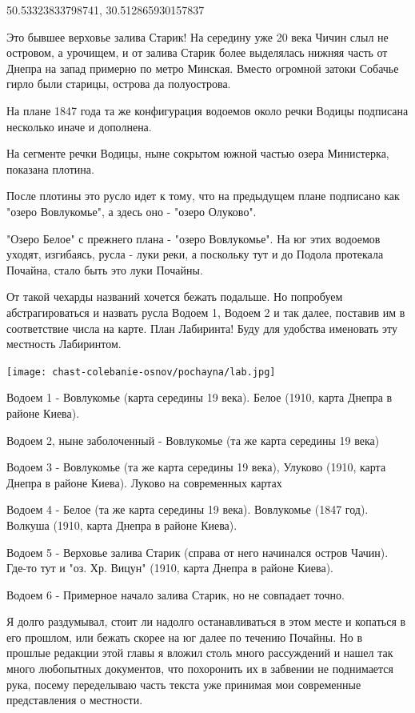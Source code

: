 50.53323833798741, 30.512865930157837 

Это бывшее верховье залива Старик!
На середину уже 20 века Чичин слыл не островом, а урочищем, и от залива Старик более выделялась нижняя часть от Днепра на запад примерно по метро Минская. Вместо огромной затоки Собачье гирло были старицы, острова да полуострова.

На плане 1847 года та же конфигурация водоемов около речки Водицы подписана несколько иначе и дополнена.

На сегменте речки Водицы, ныне сокрытом южной частью озера Министерка, показана плотина.

После плотины это русло идет к тому, что на предыдущем плане подписано как "озеро Вовлукомье", а здесь оно - "озеро Олуково".

"Озеро Белое" с прежнего плана - "озеро Вовлукомье". На юг этих водоемов уходят, изгибаясь, русла - луки реки, а поскольку тут и до Подола протекала Почайна, стало быть это луки Почайны.

От такой чехарды названий хочется бежать подальше. Но попробуем абстрагироваться и назвать русла Водоем 1, Водоем 2 и так далее, поставив им в соответствие числа на карте. План  Лабиринта! Буду для удобства именовать эту местность Лабиринтом.

\begin{center}
\texttt{[image: chast-colebanie-osnov/pochayna/lab.jpg]}
\end{center}

Водоем 1 - Вовлукомье (карта середины 19 века). Белое (1910, карта Днепра в районе Киева).

Водоем 2, ныне заболоченный - Вовлукомье (та же карта середины 19 века)

Водоем 3 - Вовлукомье (та же карта середины 19 века), Улуково (1910, карта Днепра в районе Киева). Луково на современных картах

Водоем 4 - Белое (та же карта середины 19 века). Вовлукомье (1847 год). Волкуша (1910, карта Днепра в районе Киева).

Водоем 5 - Верховье залива Старик (справа от него начинался остров Чачин). Где-то тут и "оз. Хр. Вицун" (1910, карта Днепра в районе Киева).

Водоем 6 - Примерное начало залива Старик, но не совпадает точно. 

Я долго раздумывал, стоит ли надолго останавливаться в этом месте и копаться в его прошлом, или бежать скорее на юг далее по течению Почайны. Но в прошлые редакции этой главы я вложил столь много рассуждений и нашел так много любопытных документов, что похоронить их в забвении не поднимается рука, посему переделываю часть текста уже принимая мои современные представления о местности. 

